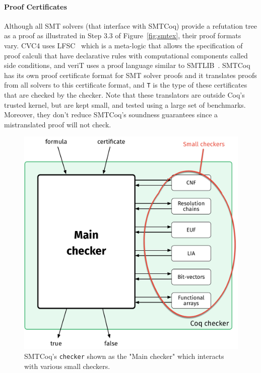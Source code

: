 \documentclass[11pt]{article}
\begin{document}
	\paragraph{Proof Certificates} Although all 
	SMT solvers (that 
	interface with SMTCoq) provide a
	refutation tree as a proof as 
	illustrated in Step 3.3 of 
	Figure~\ref{fig:smtex},
	their proof formats vary. CVC4 uses 
	LFSC~\cite{DBLP:journals/fmsd/StumpORHT13}
	which is a meta-logic that allows the 
	specification of proof calculi that have 
	declarative	rules with computational 
	components called side conditions, and 
	veriT uses a proof language similar to 
	SMTLIB~\cite{Besson1}. SMTCoq has its 
	own proof certificate format for SMT 
	solver proofs and it translates proofs 
	from all solvers to this certificate 
	format, and \texttt{T} is the type of 
	these certificates that are 
	checked by the checker. Note 
	that these translators are outside 
	Coq's trusted kernel, but are kept
	small, and tested using a large 
	set of benchmarks. Moreover, they
	don't reduce SMTCoq's soundness
	guarantees since a mistranslated
	proof will not check.
	
	\begin{figure}[t]
		\begin{center}
			\includegraphics[scale=0.3]{checker}
			\caption{SMTCoq's \texttt{checker}
				shown as the "Main checker" which 
				interacts with various small checkers.}
			\label{fig:checker}
		\end{center}
	\end{figure}
	
\end{document}
